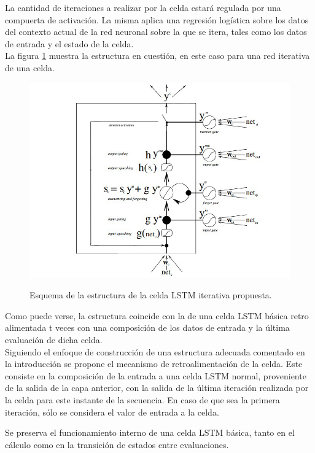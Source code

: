 \documentclass{article}
\begin{document}
La cantidad de iteraciones a realizar por la celda estará regulada por una compuerta de activación. La misma aplica una regresión logística sobre los datos del contexto actual de la red neuronal sobre la que se itera, tales como los datos de entrada y el estado de la celda.\\


La figura \ref{iterativeLSTMpicture} muestra la estructura en cuestión, en este caso para una red iterativa de una celda.\\

\begin{figure}
\includegraphics[scale=0.5,natwidth=800,natheight=600]{iterativeLSTM.jpg} 
\label{iterativeLSTMpicture}
\caption{Esquema de la estructura de la celda LSTM iterativa propuesta.}
\end{figure}

Como puede verse, la estructura coincide con la de una celda LSTM básica retro alimentada t veces con una composición de los datos de entrada y la última evaluación de dicha celda.\\

Siguiendo el enfoque de construcción de una estructura adecuada comentado en la introducción se propone el mecanismo de retroalimentación de la celda. Este consiste en la composición de la entrada a una celda LSTM normal, proveniente de la salida de la capa anterior, con la salida de la última iteración realizada por la celda para este instante de la secuencia. En caso de que sea la primera iteración, sólo se considera el valor de entrada a la celda.

Se preserva el funcionamiento interno de una celda LSTM básica, tanto en el cálculo como en la transición de estados entre evaluaciones.\\
\end{document}
